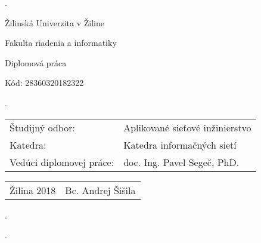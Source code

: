 \begin{titlepage}

\phantom.

\bigskip

\begin{center}
{\sc\LARGE Žilinská Univerzita v Žiline}

\medskip

{\sc\Large Fakulta riadenia a informatiky}

\vspace{4cm}

{\sc\LARGE Diplomová práca}

\medskip

{\large\bf \nazovpraceSK}

\bigskip

Kód: 28360320182322

\end{center}

\phantom.\hfill
\begin{center}


\begin{tabu} to 1.0 \textwidth { X[4,l] X[8,r] }
 Študijný odbor: & Aplikované sieťové inžinierstvo \\ 
 Katedra: & Katedra informačných sietí \\
 Vedúci diplomovej práce: & doc. Ing. Pavel Segeč, PhD. \\
\end{tabu}

\vspace*{\fill}

\begin{tabu} to 1.0 \textwidth { X[l] X[r] }
 Žilina 2018  & Bc. Andrej Šišila  \\
\end{tabu}

\end{center}
\hspace{1.7cm}\phantom.

\vspace{2.9cm}

\phantom.
\end{titlepage}